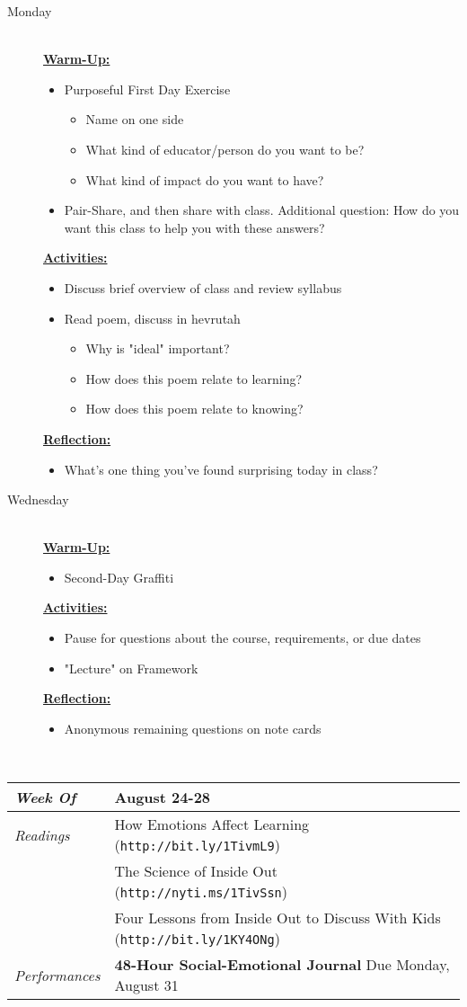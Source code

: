 \documentclass{article}
\newcommand{\tabread}{\faBook\hspace{1em}\textit{Readings}}
\newcommand{\tabperformance}{\faTasks\medspace\textit{Performances}}
\newcommand{\tabdt}{\faCalendar\hspace{1em}\textit{Week Of}}
\newcommand{\tabbreak}{\begin{center}\faAsterisk\faAsterisk\faAsterisk\\\end{center}}
\newenvironment{tabsched}
	{\small
	\begin{tabular}{p{1.5in}p{4.5in}}
	\midrule}
	{\midrule
	\end{tabular}
	\normalsize}
\newcommand{\weektwo}{August 24-28}
\newcommand{\url}[1]{\footnotesize\texttt{#1}\normalsize}
\newcommand{\listmon}{\item[\large\textsf{Monday}\normalsize] \hfill \\}
\newcommand{\listwed}{\item[\large\textsf{Wednesday}\normalsize] \hfill \\}
\newenvironment{daywu}
	{\underline{\textbf{Warm-Up:}} \hfill \\
	\begin{itemize}}
	{\end{itemize}}
\newenvironment{dayact}
	{\underline{\textbf{Activities:}} \hfill \\
	\begin{itemize}}
	{\end{itemize}}
\newenvironment{dayref}
	{\underline{\textbf{Reflection:}} \hfill \\
	\begin{itemize}}
	{\end{itemize}}
\newenvironment{weeksched}
	{\noindent
	\begin{description}}
	{\end{description}
	\newpage}
\begin{document}
\begin{weeksched}

\listmon
\begin{daywu}
	\item Purposeful First Day Exercise
		\begin{itemize}
			\item Name on one side
			\item What kind of educator/person do you want to be?
			\item What kind of impact do you want to have?
		\end{itemize}
	\item Pair-Share, and then share with class. Additional question: How do you want this class to help you with these answers?
\end{daywu}
\begin{dayact}
	\item Discuss brief overview of class and review syllabus
	\item Read poem, discuss in hevrutah
	\begin{itemize}
		\item Why is "ideal" important?
		\item How does this poem relate to learning?
		\item How does this poem relate to knowing?
	\end{itemize}
\end{dayact}
\begin{dayref}
	\item What's one thing you've found surprising today in class?
\end{dayref}

\listwed
\begin{daywu}
	\item Second-Day Graffiti
\end{daywu}
\begin{dayact}
	\item Pause for questions about the course, requirements, or due dates
	\item "Lecture" on Framework
\end{dayact}
\begin{dayref}
	\item Anonymous remaining questions on note cards
\end{dayref}
\end{weeksched}
\tabbreak
\begin{tabsched}
	\tabdt & \weektwo \\
	\midrule
	\tabread & How Emotions Affect Learning (\url{http://bit.ly/1TivmL9})\\
	& The Science of Inside Out (\url{http://nyti.ms/1TivSsn})\\
	& Four Lessons from Inside Out to Discuss With Kids (\url{http://bit.ly/1KY4ONg})\\
	\midrule
	\tabperformance & \textbf{48-Hour Social-Emotional Journal} Due Monday, August 31 \\
\end{tabsched}
\end{document}
